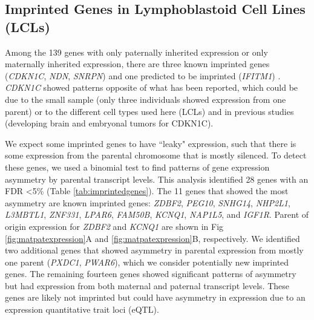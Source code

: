\subsection{Imprinted Genes in Lymphoblastoid Cell Lines (LCLs)}\label{Imprinted Genes in Lymphoblastoid Cell Lines (LCLs)}
Among the 139 genes with only paternally inherited expression or only maternally inherited expression, there are three known imprinted genes (\emph{CDKN1C}, \emph{NDN}, \emph{SNRPN}) and one predicted to be imprinted (\emph{IFITM1}) \cite{Luedi:2007ib}. \emph{CDKN1C} showed patterns opposite of what has been reported\cite{Hatada:1995jf,Matsuoka:1996uq}, which could be due to the small sample (only three individuals showed expression from one parent) or to the different cell types used here (LCLs) and in previous studies (developing brain and embryonal tumors for CDKN1C).

We expect some imprinted genes to have ``leaky" expression, such that there is some expression from the parental chromosome that is mostly silenced. To detect these genes, we used a binomial test to find patterns of gene expression asymmetry by parental transcript levels.  This analysis identified 28 genes with an FDR \textless5\% (Table \ref{tab:imprintedgenes}). The 11 genes that showed the most asymmetry are known imprinted genes: \emph{ZDBF2}, \emph{PEG10}, \emph{SNHG14}, \emph{NHP2L1}, \emph{L3MBTL1}, \emph{ZNF331}, \emph{LPAR6}, \emph{FAM50B}, \emph{KCNQ1}, \emph{NAP1L5}, and \emph{IGF1R}. Parent of origin expression for \emph{ZDBF2} and \emph{KCNQ1} are shown in Fig \ref{fig:matpatexpression}A and \ref{fig:matpatexpression}B, respectively. We identified two additional genes that showed asymmetry in parental expression from mostly one parent (\emph{PXDC1}, \emph{PWAR6}), which we consider potentially new imprinted genes. The remaining fourteen genes showed significant patterns of asymmetry but had expression from both maternal and paternal transcript levels. These genes are likely not imprinted but could have asymmetry in expression due to an expression quantitative trait loci (eQTL). 



